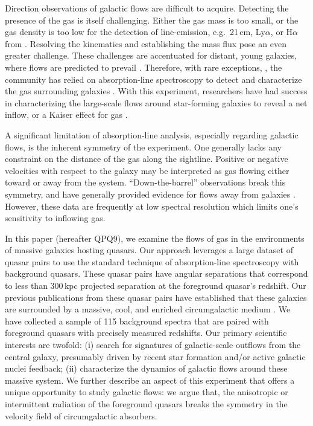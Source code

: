\documentclass[iop]{emulateapj}
\begin{document}
Direction observations of galactic flows are difficult to acquire. Detecting the presence of 
the gas is itself challenging. Either the gas mass is too small, or the gas density is too low for 
the detection of line-emission, e.g.\ 21\,cm, Ly$\alpha$, or H$\alpha$ from . Resolving 
the kinematics and establishing the mass flux pose an even greater challenge. These challenges are 
accentuated for distant, young galaxies, where flows are predicted to prevail 
\citep{Keres+09,Fumagalli+11}. Therefore, with rare exceptions, 
\citep[e.g.][]{Cantalupo+14,Hennawi+15}, the community has relied on absorption-line spectroscopy 
to detect and characterize the gas surrounding galaxies 
\citep[e.g.][]{BergeronBoisse91,Steidel+10,Prochaska+11,Tumlinson+13}. With this 
experiment, researchers have had success in characterizing the large-scale flows around 
star-forming galaxies to reveal a net inflow, or a Kaiser effect for gas \citep{Rakic+12}. 

A significant limitation of absorption-line analysis, especially regarding galactic flows, 
is the inherent symmetry of the experiment. One generally lacks any constraint on the distance of 
the gas along the sightline. Positive or negative velocities with respect to the galaxy may be 
interpreted as gas flowing either toward or away from the system. ``Down-the-barrel'' observations 
break this symmetry, and have generally provided evidence for flows away from galaxies 
\citep{Rupke+05,Martin05,Weiner+09,Rubin+14}. However, these data are frequently at low spectral 
resolution which limits one's sensitivity to inflowing gas. 

In this paper (hereafter QPQ9), we examine the flows of gas in the environments of massive 
galaxies hosting quasars. Our approach leverages a large dataset of quasar pairs 
\citep[][QPQ1]{QPQ1} to use the 
standard technique of absorption-line spectroscopy with background quasars. These quasar pairs 
have angular separations that correspond to less than 300\,kpc projected separation at the 
foreground quasar's redshift. Our previous publications from these quasar pairs have established 
that these galaxies are surrounded by a massive, cool, and enriched circumgalactic medium 
\citep[QPQ5, QPQ6, QPQ7:][]{QPQ5,QPQ6,QPQ7}. We have collected a sample of 115 background 
spectra that are paired with foreground quasars with precisely measured redshifts. Our primary 
scientific interests are twofold: (i) search for signatures of galactic-scale outflows from the 
central galaxy, presumably driven by recent star formation and/or active galactic nuclei feedback; 
(ii) characterize the dynamics of galactic flows around these massive system. We further describe 
an aspect of this experiment that offers a unique opportunity to study galactic flows: we argue 
that, the anisotropic or intermittent radiation of the foreground quasars breaks the symmetry in 
the velocity field of circumgalactic absorbers. 
\end{document}
